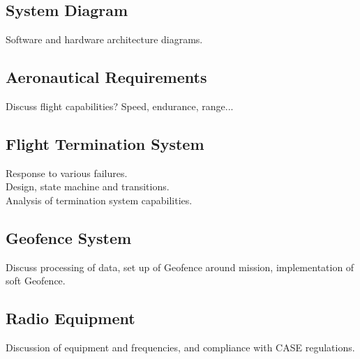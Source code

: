 \subsection{System Diagram}
Software and hardware architecture diagrams.

\subsection{Aeronautical Requirements}
Discuss flight capabilities? Speed, endurance, range...

\subsection{Flight Termination System}
Response to various failures.\\

Design, state machine and transitions.\\

Analysis of termination system capabilities.

\subsection{Geofence System}
Discuss processing of data, set up of Geofence around mission, implementation of soft Geofence.

\subsection{Radio Equipment}
Discussion of equipment and frequencies, and compliance with CASE regulations.